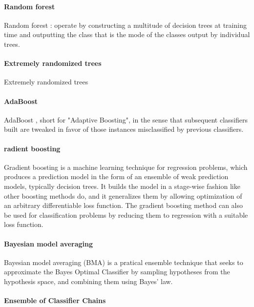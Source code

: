 \paragraph{Random forest}

Random forest \cite{breiman2001random}: operate by constructing a multitude of decision trees at training time and outputting the class that is the mode of the classes output by individual trees. 

\paragraph{Extremely randomized trees}

Extremely randomized trees \cite{geurts2006extremely}

\paragraph{AdaBoost}

AdaBoost \cite{freund1997decision}, short for "Adaptive Boosting", in the sense that subsequent classifiers built are tweaked in favor of those instances misclassified by previous classifiers. 

\paragraph{radient boosting}
\label{sec:ml:GradientBoosting}
Gradient boosting \cite{friedman2001greedy} is a machine learning technique for regression problems, which produces a prediction model in the form of an ensemble of weak prediction models, typically decision trees. It builds the model in a stage-wise fashion like other boosting methods do, and it generalizes them by allowing optimization of an arbitrary differentiable loss function. The gradient boosting method can also be used for classification problems by reducing them to regression with a suitable loss function.

\paragraph{Bayesian model averaging}

Bayesian model averaging (BMA) \cite{hoeting1999bayesian}  is a pratical ensemble technique that seeks to approximate the Bayes Optimal Classifier by sampling hypotheses from the hypothesis space, and combining them using Bayes' law.

\paragraph{Ensemble of Classifier Chains}

